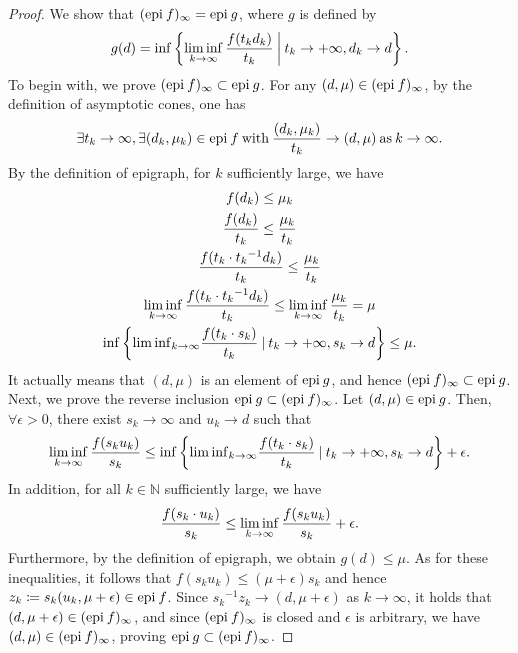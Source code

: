 \documentclass[a4paper,11pt, oneside]{book}
\theoremstyle{definition}
\newcommand{\NaturalNumberSet}{\mathbb{N}}
\newcommand{\Epigraph}[1]{\text{\rm epi\:${#1}$}} %
\begin{document}
\begin{proof}
  We show that $(\Epigraph{f})_{\infty} = \Epigraph{g}$, where $g$ is defined by
  \begin{equation}
    g(d) = \inf \left\{ \liminf_{k \to \infty} \frac{f(t_k d_k)}{t_k} \:\middle|\: t_k \to +\infty, d_k \to d \right\}. \notag
  \end{equation}
  To begin with, we prove $(\Epigraph{f})_{\infty} \subset \Epigraph{g}$. For any $(d, \mu) \in (\Epigraph{f})_{\infty}$, by the definition of asymptotic cones, one has
  \begin{equation}
    \exists t_k \to \infty, \exists (d_k, \mu_k) \in \Epigraph{f} \:\text{with}\: \frac{(d_k, \mu_k)}{t_k} \to (d, \mu) \:\text{as}\: k \to \infty. \notag
  \end{equation}
  By the definition of epigraph, for $k$ sufficiently large, we have
  \begin{gather}
    f(d_k) \leq \mu_k \notag\\
    \frac{f(d_k)}{t_k} \leq \frac{\mu_k}{t_k} \notag\\
    \frac{f(t_k \cdot {t_k}^{-1}d_k)}{t_k} \leq \frac{\mu_k}{t_k} \notag\\
    \liminf_{k \to \infty} \frac{f(t_k \cdot {t_k}^{-1}d_k)}{t_k} \leq \liminf_{k \to \infty} \frac{\mu_k}{t_k} = \mu \notag \\
    \inf \left\{ {\liminf}_{k \to \infty} \frac{f(t_k \cdot s_k)}{t_k} \:|\: t_k \to +\infty, s_k \to d \right\}\leq \mu. \notag
  \end{gather}
  It actually means that $(d, \mu)$ is an element of $\Epigraph{g}$, and hence $(\Epigraph{f})_{\infty} \subset \Epigraph{g}$. \\
  Next, we prove the reverse inclusion $\Epigraph{g} \subset (\Epigraph{f})_{\infty}$. Let $(d, \mu) \in \Epigraph{g}$. Then, $\forall \epsilon > 0$, there exist $s_k \to \infty$ and $u_k \to d$ such that
  \begin{equation}
    \liminf_{k \to \infty} \frac{f(s_k u_k)}{s_k} \leq \inf \left\{ {\liminf}_{k \to \infty} \frac{f(t_k \cdot s_k)}{t_k} \:|\: t_k \to +\infty, s_k \to d \right\} + \epsilon. \notag
  \end{equation}
  In addition, for all $k \in \NaturalNumberSet$ sufficiently large, we have
  \begin{equation}
    \frac{f(s_k \cdot u_k)}{s_k} \leq \liminf_{k \to \infty} \frac{f(s_k u_k)}{s_k} + \epsilon. \notag
  \end{equation}
  Furthermore, by the definition of epigraph, we obtain $g(d) \leq \mu$. As for these inequalities, it follows that $f(s_k u_k) \leq (\mu + \epsilon) s_k$ and hence $z_k \coloneqq s_k (u_k,\mu + \epsilon) \in \Epigraph{f}$. Since ${s_k}^{-1}z_k \to (d, \mu + \epsilon)$ as $k \to \infty$, it holds that $(d, \mu + \epsilon) \in (\Epigraph{f})_{\infty}$, and since $(\Epigraph{f})_{\infty}$ is closed and $\epsilon$ is arbitrary, we have $(d, \mu) \in (\Epigraph{f})_{\infty}$, proving $\Epigraph{g} \subset (\Epigraph{f})_{\infty}$.
\end{proof}
\end{document}
